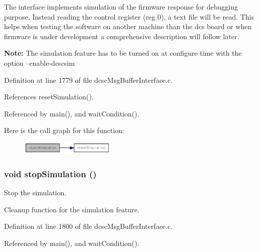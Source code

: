 The interface implements simulation of the firmware response for debugging purpose. Instead reading the control register (reg 0), a text file will be read. This helps when testing the software on another machine than the dcs board or when firmware is under development a comprehensive description will follow later.\par
 {\bf Note:} The simulation feature has to be turned on at configure time with the option --enable-dcscsim 

Definition at line 1779 of file dcsc\-Msg\-Buffer\-Interface.c.

References reset\-Simulation().

Referenced by main(), and wait\-Condition().

Here is the call graph for this function:\begin{figure}[H]
\begin{center}
\leavevmode
\includegraphics[width=129pt]{group__dcsc__msg__buffer__access_g0adb3aacb8d7ad32ceabe66a9dcbb401_cgraph}
\end{center}
\end{figure}
\hypertarget{group__dcsc__msg__buffer__access_gd871881385919aff64a8b679984cd018}{
\subsubsection[stopSimulation]{\setlength{\rightskip}{0pt plus 5cm}void stop\-Simulation ()}}
\label{group__dcsc__msg__buffer__access_gd871881385919aff64a8b679984cd018}


Stop the simulation. 

Cleanup function for the simulation feature. 

Definition at line 1800 of file dcsc\-Msg\-Buffer\-Interface.c.

Referenced by main(), and wait\-Condition().